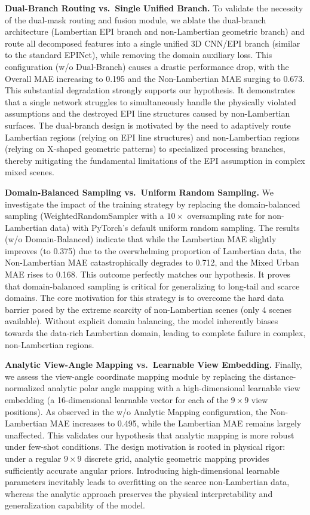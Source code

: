 \documentclass[lettersize,journal]{IEEEtran}
\begin{document}
\textbf{Dual-Branch Routing vs.\ Single Unified Branch.} 
To validate the necessity of the dual-mask routing and fusion module, we ablate the dual-branch architecture (Lambertian EPI branch and non-Lambertian geometric branch) and route all decomposed features into a single unified 3D CNN/EPI branch (similar to the standard EPINet), while removing the domain auxiliary loss. This configuration (w/o Dual-Branch) causes a drastic performance drop, with the Overall MAE increasing to 0.195 and the Non-Lambertian MAE surging to 0.673. This substantial degradation strongly supports our hypothesis. It demonstrates that a single network struggles to simultaneously handle the physically violated assumptions and the destroyed EPI line structures caused by non-Lambertian surfaces. The dual-branch design is motivated by the need to adaptively route Lambertian regions (relying on EPI line structures) and non-Lambertian regions (relying on X-shaped geometric patterns) to specialized processing branches, thereby mitigating the fundamental limitations of the EPI assumption in complex mixed scenes.

\textbf{Domain-Balanced Sampling vs.\ Uniform Random Sampling.} 
We investigate the impact of the training strategy by replacing the domain-balanced sampling (WeightedRandomSampler with a $10\times$ oversampling rate for non-Lambertian data) with PyTorch's default uniform random sampling. The results (w/o Domain-Balanced) indicate that while the Lambertian MAE slightly improves (to 0.375) due to the overwhelming proportion of Lambertian data, the Non-Lambertian MAE catastrophically degrades to 0.712, and the Mixed Urban MAE rises to 0.168. This outcome perfectly matches our hypothesis. It proves that domain-balanced sampling is critical for generalizing to long-tail and scarce domains. The core motivation for this strategy is to overcome the hard data barrier posed by the extreme scarcity of non-Lambertian scenes (only 4 scenes available). Without explicit domain balancing, the model inherently biases towards the data-rich Lambertian domain, leading to complete failure in complex, non-Lambertian regions.

\textbf{Analytic View-Angle Mapping vs.\ Learnable View Embedding.} 
Finally, we assess the view-angle coordinate mapping module by replacing the distance-normalized analytic polar angle mapping with a high-dimensional learnable view embedding (a 16-dimensional learnable vector for each of the $9 \times 9$ view positions). As observed in the w/o Analytic Mapping configuration, the Non-Lambertian MAE increases to 0.495, while the Lambertian MAE remains largely unaffected. This validates our hypothesis that analytic mapping is more robust under few-shot conditions. The design motivation is rooted in physical rigor: under a regular $9 \times 9$ discrete grid, analytic geometric mapping provides sufficiently accurate angular priors. Introducing high-dimensional learnable parameters inevitably leads to overfitting on the scarce non-Lambertian data, whereas the analytic approach preserves the physical interpretability and generalization capability of the model.
\end{document}
